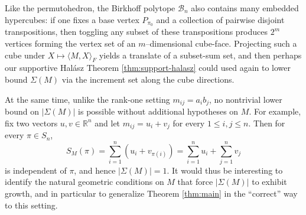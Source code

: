 \documentclass[12pt]{amsart}
\theoremstyle{definition}
\theoremstyle{remark}
\newcommand{\RR}{\mathbb{R}}
\newcommand{\abs}[1]{\left|#1\right|}
\begin{document}
Like the permutohedron, the Birkhoff polytope $\mathcal{B}_n$ also contains many embedded hypercubes: if one fixes a base vertex $P_{\pi_0}$ and a collection of
pairwise disjoint transpositions, then toggling any subset of these transpositions produces
$2^m$ vertices forming the vertex set of an $m$--dimensional cube-face. Projecting such a cube under $X\mapsto\langle M,X\rangle_F$ yields a translate of a subset-sum set,
and then perhaps our supportive Hal\'asz Theorem \ref{thm:support-halasz} could used again to lower bound $\Sigma(M)$ via the
increment set along the cube directions.

At the same time, unlike the rank-one setting $m_{ij}=a_i b_j$, no nontrivial lower bound on
$\abs{\Sigma(M)}$ is possible without additional hypotheses on $M$.
For example, fix two vectors $u,v\in\RR^n$ and let $m_{ij}=u_i+v_j$ for every $1 \leq i,j \leq n$. Then for every $\pi\in S_n$,
\[
S_M(\pi)=\sum_{i=1}^n (u_i+v_{\pi(i)})=\sum_{i=1}^n u_i+\sum_{j=1}^n v_j
\]
is independent of $\pi$, and hence $\abs{\Sigma(M)}=1$.
It would thus be interesting to identify the natural geometric conditions on $M$ that force $\abs{\Sigma(M)}$ to exhibit growth, and in particular to generalize Theorem \ref{thm:main} in the ``correct'' way to this setting. 
\end{document}
